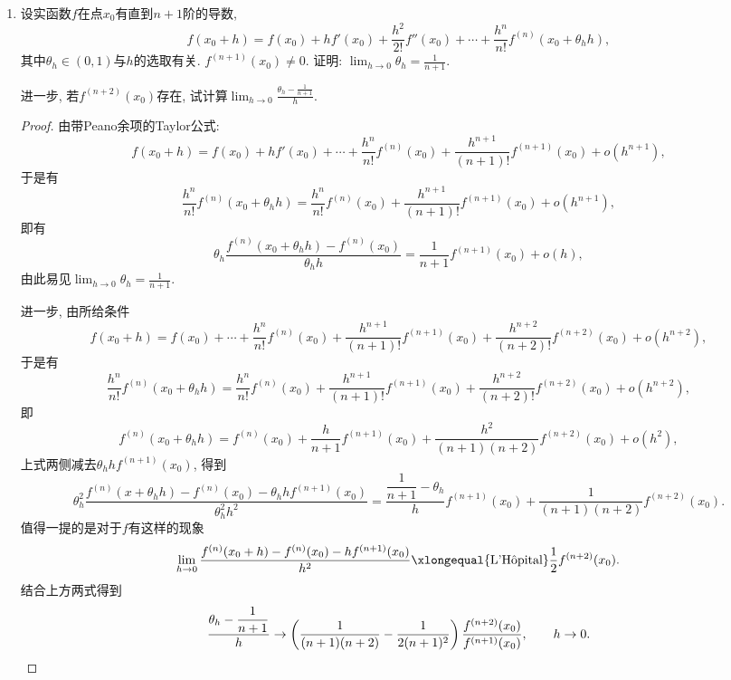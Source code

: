 \begin{5a}
\begin{enumerate}
\begin{proof}
\[\begin{vmatrix}
f'(-1)&0&1&-2&3&-4&5\\ \\
f'(1)&0&1&2&3&4&5
\end{vmatrix}=0.\]求得
\[P^{(5)}=\frac{60\left(f(\alpha)-f(-\alpha)\right)}{\alpha(\alpha^2-1)^2}
+\frac{(\alpha^2-3)\left(f(1)-f(-1)\right)}{(\alpha^2-1)^2}
-\frac{30\left(f'(1)+f'(-1)\right)}{\alpha^2-1}.\]
考虑\(F=f-P\), 则\(F\)在\([-\alpha,\alpha]\)上连续, 
在\((-\alpha,\alpha)\)内五阶可导, 且
\[F(-\alpha)=F(\alpha)=F(-1)=F(1)=F'(-1)=F'(1)=0.\]
从而存在\(\xi\in(-\alpha,\alpha)\)使得\(F^{(5)}(\xi)=0\), 即
\[f^{(5)}(\xi)=\frac{60\left(f(\alpha)-f(-\alpha)\right)}{\alpha(\alpha^2-1)^2}
+\frac{(\alpha^2-3)\left(f(1)-f(-1)\right)}{(\alpha^2-1)^2}
-\frac{30\left(f'(1)+f'(-1)\right)}{\alpha^2-1}.\]
令\(\alpha=\sqrt{3}\), 即得待证明之式.
\end{proof}
\item 设实函数\(f\)在点\(x_0\)有直到\(n+1\)阶的导数,
\[f(x_0+h)=f(x_0)+hf'(x_0)+\frac{h^2}{2!}f''(x_0)+\cdots+\frac{h^n}{n!}f^{(n)}(x_0+\theta_hh),\]
其中\(\theta_h\in (0,1)\)与\(h\)的选取有关. \(f^{(n+1)}(x_0)\ne 0\). 
证明: \(\lim_{h\rightarrow 0}\theta_h=\frac{1}{n+1}\).

进一步, 若\(f^{(n+2)}(x_0)\)存在, 试计算\(\lim_{h\rightarrow 0}\frac{\theta_h-\displaystyle\frac{1}{n+1}}{h}.\)
\begin{proof}
由带Peano余项的Taylor公式:\[f(x_0+h)=f(x_0)+hf'(x_0)+\cdots+\frac{h^n}{n!}f^{(n)}(x_0)+\frac{h^{n+1}}{(n+1)!}f^{(n+1)}(x_0)+o(h^{n+1}),\]
于是有\[\frac{h^n}{n!}f^{(n)}(x_0+\theta_hh)=\frac{h^n}{n!}f^{(n)}(x_0)+\frac{h^{n+1}}{(n+1)!}f^{(n+1)}(x_0)+o(h^{n+1}),\]
即有\[\theta_h\frac{f^{(n)}(x_0+\theta_hh)-f^{(n)}(x_0)}{\theta_hh}=\frac{1}{n+1}f^{(n+1)}(x_0)+o(h),\]
由此易见\(\lim_{h\rightarrow 0}\theta_h=\frac{1}{n+1}.\)

进一步, 由所给条件\[f(x_0+h)=f(x_0)+\cdots+\frac{h^n}{n!}f^{(n)}(x_0)+\frac{h^{n+1}}{(n+1)!}f^{(n+1)}(x_0)+\frac{h^{n+2}}{(n+2)!}f^{(n+2)}(x_0)+o(h^{n+2}),\]
于是有\[\frac{h^n}{n!}f^{(n)}(x_0+\theta_hh)=\frac{h^n}{n!}f^{(n)}(x_0)+\frac{h^{n+1}}{(n+1)!}f^{(n+1)}(x_0)+\frac{h^{n+2}}{(n+2)!}f^{(n+2)}(x_0)+o(h^{n+2}),\]
即\[f^{(n)}(x_0+\theta_hh)=f^{(n)}(x_0)+\frac{h}{n+1}f^{(n+1)}(x_0)+\frac{h^2}{(n+1)(n+2)}f^{(n+2)}(x_0)+o(h^{2}),\]
上式两侧减去\(\theta_hhf^{(n+1)}(x_0)\), 得到
\[\theta^2_h\frac{f^{(n)}(x+\theta_hh)-f^{(n)}(x_0)-\theta_hhf^{(n+1)}(x_0)}{\theta_h^2h^2}
=\frac{\dfrac{1}{n+1}-\theta_h}{h}f^{(n+1)}(x_0)+\frac{1}{(n+1)(n+2)}f^{(n+2)}(x_0).\]
值得一提的是对于\(f\)有这样的现象\[\lim_{h\rightarrow 0}\frac{f^{(n)}(x_0+h)-f^{(n)}(x_0)-hf^{(n+1)}(x_0)}{h^2}\xlongequal{\text{L'H\^{o}pital}}\frac{1}{2}f^{(n+2)}(x_0).\]
结合上方两式得到\[\frac{\theta_h-\dfrac{1}{n+1}}{h}\rightarrow\left(\frac{1}{(n+1)(n+2)}-\frac{1}{2(n+1)^2}\right)\frac{f^{(n+2)}(x_0)}{f^{(n+1)}(x_0)},\qquad h\rightarrow 0.\qedhere\]
\end{proof}


\end{enumerate}
\end{5a}
